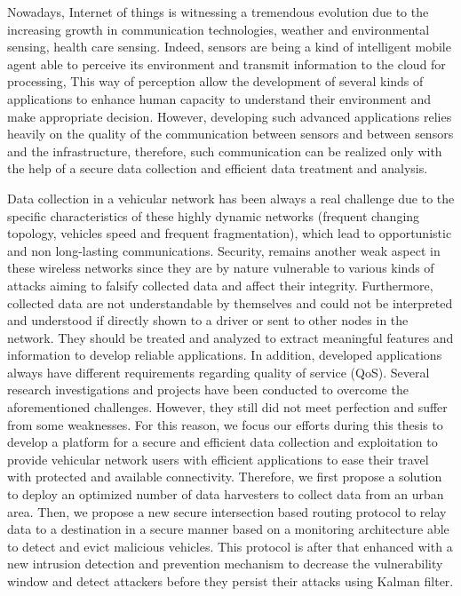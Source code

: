 Nowadays,
	Internet of things is witnessing a tremendous evolution due to the increasing growth in communication technologies,
	weather and environmental sensing, health care sensing.
Indeed,
	sensors are being a kind of intelligent mobile agent able to perceive its environment and transmit information to the cloud for processing,
This way of perception allow the development of several kinds of applications to enhance human capacity to understand their environment and make appropriate decision.
However,
	developing such advanced applications relies heavily on the quality of the communication between sensors and between sensors and the infrastructure,
	therefore,
	such communication can be realized only with the help of a secure data collection and efficient data treatment and analysis.

Data collection in a vehicular network has been always a real challenge due to the specific characteristics of these highly dynamic networks (frequent changing topology,
	vehicles speed and frequent fragmentation),
	which lead to opportunistic and non long-lasting communications.
Security,
	remains another weak aspect in these wireless networks since they are by nature vulnerable to various kinds of attacks aiming to falsify collected data and affect their integrity.
Furthermore,
	collected data are not understandable by themselves and could not be interpreted and understood if directly shown to a driver or sent to other nodes in the network.
They should be treated and analyzed to extract meaningful features and information to develop reliable applications.
In addition,
	developed applications always have different requirements regarding quality of service (QoS).
Several research investigations and projects have been conducted to overcome the aforementioned challenges.
However,
	they still did not meet perfection and suffer from some weaknesses.
For this reason,
	we focus our efforts during this thesis to develop a platform for a secure and efficient data collection and exploitation to provide vehicular network users with efficient applications to ease their travel with protected and available connectivity.
Therefore,
	we first propose a solution to deploy an optimized number of data harvesters to collect data from an urban area.
Then,
	we propose a new secure intersection based routing protocol to relay data to a destination in a secure manner based on a monitoring architecture able to detect and evict malicious vehicles.
This protocol is after that enhanced with a new intrusion detection and prevention mechanism to decrease the vulnerability window and detect attackers before they persist their attacks using Kalman filter.
